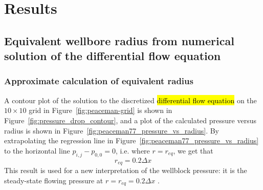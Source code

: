 
\section{Results} %
\label{sec:results}

\subsection{Equivalent wellbore radius from numerical solution of the differential flow equation} %
\label{sub:equivalent_wellbore_radius_from_numerical_solution_of_differential_flow_equation}

\subsubsection{Approximate calculation of equivalent radius} %
\label{ssub:approximate_calculation_of_equivalent_radius}
A contour plot of the solution to the discretized \hl{differential flow equation} on the $10 \times 10$ grid in Figure~\ref{fig:peaceman-grid} is shown in Figure~\ref{fig:pressure_drop_contour}, and a plot of the calculated pressure versus radius is shown in Figure~\ref{fig:peaceman77_pressure_vs_radius}. By extrapolating  the regression line in Figure~\ref{fig:peaceman77_pressure_vs_radius} to the horizontal line $p_{i,j}-p_{0,0}=0$, i.e. where $r=r_{eq}$, we get that
\begin{equation}
    r_{eq} = 0.2 \Delta x
\end{equation}
This result is used for a new interpretation of the wellblock pressure: it is the steady-state flowing pressure at $r=r_{eq}=0.2 \Delta x$ \cite{Peaceman1978Interpretation}.

